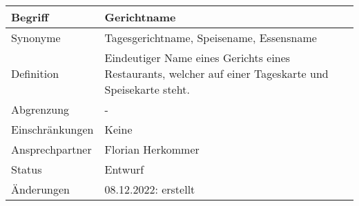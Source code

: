 \begin{table}[H]
    \centering
    \label{gls:gerichtname}
    \begin{tabularx}{\textwidth}{| l | X |}
        \hline
        Begriff         & Gerichtname                                                                                            \\
        \hline
        Synonyme        & Tagesgerichtname, Speisename, Essensname                                                               \\
        \hline
        Definition      & Eindeutiger Name eines Gerichts eines Restaurants, welcher auf einer Tageskarte und Speisekarte steht. \\
        \hline
        Abgrenzung      & -                                                                                                      \\
        \hline
        Einschränkungen & Keine                                                                                                  \\
        \hline
        Ansprechpartner & Florian Herkommer                                                                                      \\
        \hline
        Status          & Entwurf                                                                                                \\
        \hline
        Änderungen      & 08.12.2022: erstellt                                                                                   \\
        \hline
    \end{tabularx}
\end{table}



